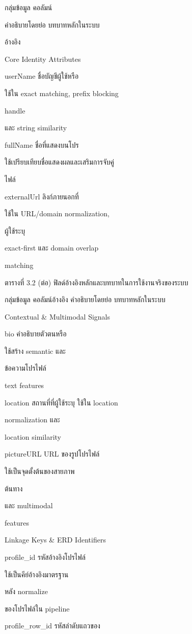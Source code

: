 \documentclass[12pt,a4paper]{report}
\begin{document}
กลุ่มข้อมูล คอลัมน์\par
คำอธิบายโดยย่อ บทบาทหลักในระบบ\par
อ้างอิง\par
Core Identity Attributes\par
userName ชื่อบัญชีผู้ใช้หรือ\par
ใช้ใน exact matching, prefix blocking\par
handle\par
และ string similarity\par
fullName ชื่อที่แสดงบนโปร\par
ใช้เปรียบเทียบชื่อแสดงผลและเสริมการจับคู่\par
ไฟล์\par
externalUrl ลิงก์ภายนอกที่\par
ใช้ใน URL/domain normalization,\par
ผู้ใช้ระบุ\par
exact-first และ domain overlap\par
matching\par
\clearpage
\begin{center}\small ตารางที่ 3.2 (ต่อ) ฟิลด์อ้างอิงหลักและบทบาทในการใช้งานจริงของระบบ\end{center}
กลุ่มข้อมูล คอลัมน์อ้างอิง คำอธิบายโดยย่อ บทบาทหลักในระบบ\par
Contextual \& Multimodal Signals\par
bio คำอธิบายตัวตนหรือ\par
ใช้สร้าง semantic และ\par
ข้อความโปรไฟล์\par
text features\par
location สถานที่ที่ผู้ใช้ระบุ ใช้ใน location\par
normalization และ\par
location similarity\par
pictureURL URL ของรูปโปรไฟล์\par
ใช้เป็นจุดตั้งต้นของสายภาพ\par
ต้นทาง\par
และ multimodal\par
features\par
Linkage Keys \& ERD Identifiers\par
profile\_id รหัสอ้างอิงโปรไฟล์\par
ใช้เป็นคีย์อ้างอิงมาตรฐาน\par
หลัง normalize\par
ของโปรไฟล์ใน pipeline\par
profile\_row\_id รหัสลำดับแถวของ\par
\end{document}
